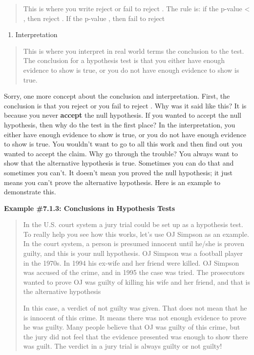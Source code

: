 \documentclass[]{book}
\providecommand{\tightlist}{%
  \setlength{\itemsep}{0pt}\setlength{\parskip}{0pt}}
\begin{document}
\begin{quote}
This is where you write reject or fail to reject . The rule is: if the
p-value \textless{} , then reject . If the p-value , then fail to reject
\end{quote}

\begin{enumerate}
\def\labelenumi{\arabic{enumi}.}
\setcounter{enumi}{5}
\tightlist
\item
  Interpretation
\end{enumerate}

\begin{quote}
This is where you interpret in real world terms the conclusion to the
test. The conclusion for a hypothesis test is that you either have
enough evidence to show is true, or you do not have enough evidence to
show is true.
\end{quote}

Sorry, one more concept about the conclusion and interpretation. First,
the conclusion is that you reject or you fail to reject . Why was it
said like this? It is because you never \textbf{accept} the null hypothesis.
If you wanted to accept the null hypothesis, then why do the test in the
first place? In the interpretation, you either have enough evidence to
show is true, or you do not have enough evidence to show is true. You
wouldn't want to go to all this work and then find out you wanted to
accept the claim. Why go through the trouble? You always want to show
that the alternative hypothesis is true. Sometimes you can do that and
sometimes you can't. It doesn't mean you proved the null hypothesis; it
just means you can't prove the alternative hypothesis. Here is an
example to demonstrate this.

\textbf{Example \#7.1.3: Conclusions in Hypothesis Tests}

\begin{quote}
In the U.S. court system a jury trial could be set up as a hypothesis
test. To really help you see how this works, let's use OJ Simpson as
an example. In the court system, a person is presumed innocent until
he/she is proven guilty, and this is your null hypothesis. OJ Simpson
was a football player in the 1970s. In 1994 his ex-wife and her friend
were killed. OJ Simpson was accused of the crime, and in 1995 the case
was tried. The prosecutors wanted to prove OJ was guilty of killing
his wife and her friend, and that is the alternative hypothesis

In this case, a verdict of not guilty was given. That does not mean
that he is innocent of this crime. It means there was not enough
evidence to prove he was guilty. Many people believe that OJ was
guilty of this crime, but the jury did not feel that the evidence
presented was enough to show there was guilt. The verdict in a jury
trial is always guilty or not guilty!
\end{quote}
\end{document}

